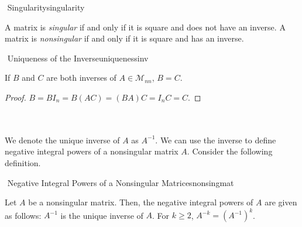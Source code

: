         \begin{definition}{\Stop\,\,Singularity}{singularity}

            A matrix is \textit{singular} if and only if it is square and does not have an inverse. A matrix is \textit{nonsingular} if and only if it is square and has an inverse.
            
        \end{definition}
        \begin{theorem}{\Stop\,\,Uniqueness of the Inverse}{uniquenessinv}

            If \(B\) and \(C\) are both inverses of \(A\in\mathcal{M}_{nn}\), \(B=C\).
            \begin{proof}
                    \(B=BI_n=B(AC)=(BA)C=I_nC=C\).
             \end{proof}
            
        \end{theorem}
        \pagebreak
        \vphantom
        \\
        \\
        We denote the unique inverse of \(A\) as \(A^{-1}\). We can use the inverse to define negative integral powers of a nonsingular matrix \(A\). Consider the following definition.
        \begin{definition}{\Stop\,\,Negative Integral Powers of a Nonsingular Matrices}{nonsingmat}

            Let \(A\) be a nonsingular matrix. Then, the negative integral powers of \(A\) are given as follows: \(A^{-1}\) is the unique inverse of \(A\). For \(k\geq2\), \(A^{-k}=(A^{-1})^k\).
            
        \end{definition}
